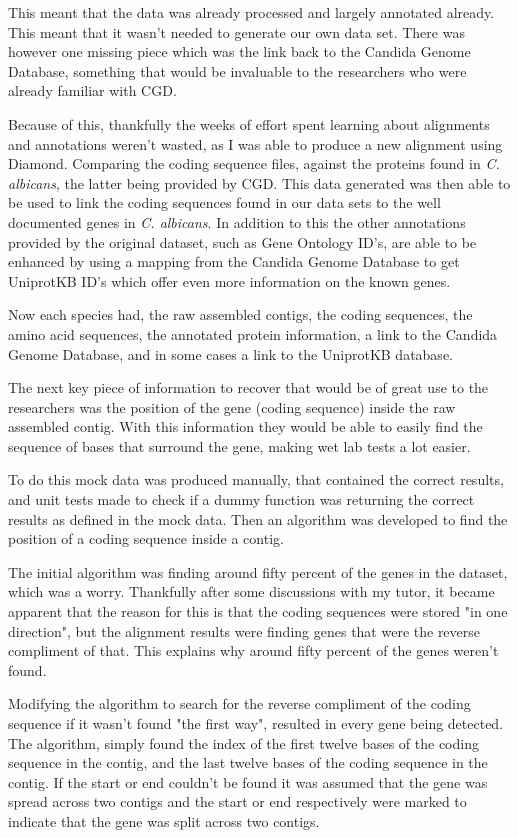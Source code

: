 This meant that the data was already processed and largely annotated already. This meant that it wasn't needed to generate our own data set. There was however one missing piece which was the link back to the Candida Genome Database, something that would be invaluable to the researchers who were already familiar with CGD. 

Because of this, thankfully the weeks of effort spent learning about alignments and annotations weren't wasted, as I was able to produce a new alignment using Diamond. Comparing the coding sequence files, against the proteins found in \textit{C. albicans}, the latter being provided by CGD. This data generated was then able to be used to link the coding sequences found in our data sets to the well documented genes in \textit{C. albicans}. In addition to this the other annotations provided by the original dataset, such as Gene Ontology ID's, are able to be enhanced by using a mapping from the Candida Genome Database to get UniprotKB ID's which offer even more information on the known genes. 

Now each species had, the raw assembled contigs, the coding sequences, the amino acid sequences, the annotated protein information, a link to the Candida Genome Database, and in some cases a link to the UniprotKB database.

The next key piece of information to recover that would be of great use to the researchers was the position of the gene (coding sequence) inside the raw assembled contig. With this information they would be able to easily find the sequence of bases that surround the gene, making wet lab tests a lot easier. 

To do this mock data was produced manually, that contained the correct results, and unit tests made to check if a dummy function was returning the correct results as defined in the mock data. Then an algorithm was developed to find the position of a coding sequence inside a contig. 

The initial algorithm was finding around fifty percent of the genes in the dataset, which was a worry. Thankfully after some discussions with my tutor, it became apparent that the reason for this is that the coding sequences were stored "in one direction", but the alignment results were finding genes that were the reverse compliment of that. This explains why around fifty percent of the genes weren't found. 

Modifying the algorithm to search for the reverse compliment of the coding sequence if it wasn't found "the first way", resulted in every gene being detected. The algorithm, simply found the index of the first twelve bases of the coding sequence in the contig, and the last twelve bases of the coding sequence in the contig. If the start or end couldn't be found it was assumed that the gene was spread across two contigs and the start or end respectively were marked to indicate that the gene was split across two contigs. 

